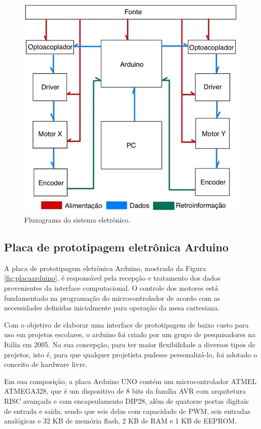 \begin{figure}[H]
\centering
\caption{Fluxograma do sistema eletrônico.}\label{fig:fluxogramaeletronico}
\includegraphics[scale = 0.6]{figuras/fluxogramaeletronico}
\end{figure}
    
\subsection{Placa de prototipagem eletrônica Arduino}\label{subsec:metarduino}

A placa de prototipagem eletrônica Arduino, mostrada da Figura \ref{fig:placaarduino}, é responsável pela recepção e tratamento dos dados provenientes 
da interface computacional. O controle dos motores está fundamentado na programação do microcontrolador 
de acordo com as necessidades definidas inicialmente para operação da mesa cartesiana.

Com o objetivo de elaborar uma interface de prototipagem de baixo custo para uso em projetos escolares, 
o arduino foi criado por um grupo de pesquisadores na Itália em 2005. Na sua concepção, para ter maior 
flexibilidade a diversos tipos de projetos, isto é, para que qualquer projetista pudesse personalizá-lo, 
foi adotado o conceito de hardware livre.

Em sua composição, a placa Arduino UNO contém um microcontrolador ATMEL ATMEGA328, que é um dispositivo 
de 8 bits da família AVR com arquitetura \ac{RISC} avançada e com encapsulamento DIP28, além de quatorze portas 
digitais de entrada e saída, sendo que seis delas com capacidade de \ac{PWM}, seis 
entradas analógicas e 32 KB de memória flash, 2 KB de \ac{RAM} e 1 KB de \ac{EEPROM}. 

